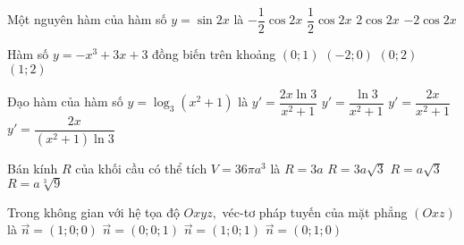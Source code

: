 \begin{ex}%
Một nguyên hàm của hàm số $ y=\sin2x $ là
\choice
{\True $ -\dfrac{1}{2}\cos2x $}
{$ \dfrac{1}{2}\cos2x $}
{$ 2\cos2x $}
{$ -2\cos2x $}
\end{ex}

\begin{ex}%
Hàm số $ y=-x^3+3x+3 $ đồng biến trên khoảng
\choice
{\True $ (0;1) $}
{$ (-2;0) $}
{$ (0;2) $}
{$ (1;2) $}
\end{ex}

\begin{ex}%
Đạo hàm của hàm số $ y=\log_3(x^2+1) $ là
\choice
{$ y'=\dfrac{2x\ln 3}{x^2+1} $}
{$ y'=\dfrac{\ln 3}{x^2+1} $}
{$ y'=\dfrac{2x}{x^2+1} $}
{\True $ y'=\dfrac{2x}{(x^2+1)\ln 3} $}
\end{ex}

\begin{ex}%
Bán kính $ R $ của khối cầu có thể tích $ V=36\pi a^3 $ là
\choice
{\True $ R=3a $}
{$ R=3a\sqrt{3} $}
{$ R=a\sqrt{3} $}
{$ R=a\sqrt[3]{9} $}
\end{ex}

\begin{ex}%
Trong không gian với hệ tọa độ $  Oxyz, $ véc-tơ pháp tuyến của mặt phẳng $ (Oxz) $ là
\choice
{$ \overrightarrow{n}=(1;0;0) $}
{$ \overrightarrow{n}=(0;0;1) $}
{$ \overrightarrow{n}=(1;0;1) $}
{\True $ \overrightarrow{n}=(0;1;0) $}
\end{ex}


